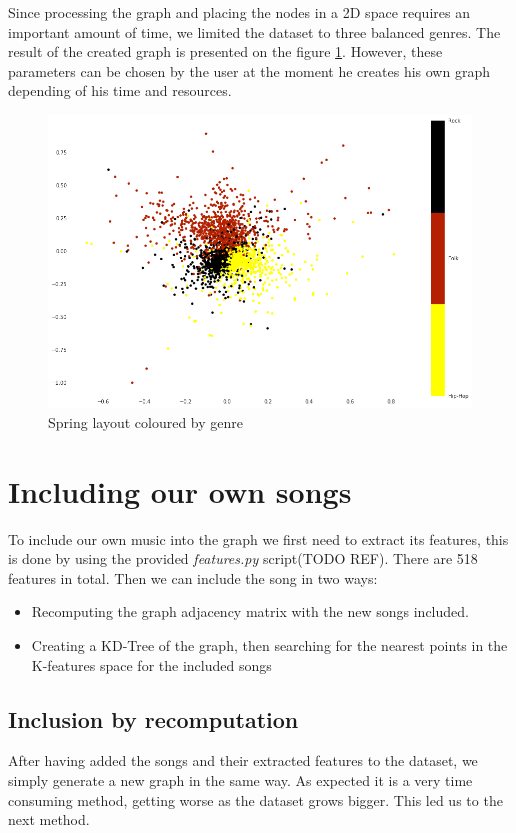 Since processing the graph and placing the nodes in a 2D space requires an important amount of time, we limited the dataset to three balanced genres. The result of the created graph is presented on the figure \ref{fig:spring_layout}. However, these parameters can be chosen by the user at the moment he creates his own graph depending of his time and resources.

\begin{figure}[H]
\centering
\includegraphics[width=\linewidth] {./Figures/graph_2}
\caption{Spring layout coloured by genre}
\label{fig:spring_layout}
\end{figure}
\section{Including our own songs}

To include our own music into the graph we first need to extract its features, this is done by using
the provided \textit{features.py} script(TODO REF). There are 518 features in total.
Then we can include the song in two ways:
\begin{itemize}
\item Recomputing the graph adjacency matrix with the new songs included.
\item Creating a KD-Tree of the graph, then searching for the nearest points in the K-features space for the included songs
\end{itemize}

\subsection{Inclusion by recomputation}
After having added the songs and their extracted features to the dataset, we simply generate a new graph in the same way. As expected it is a very time consuming method, getting worse as the dataset grows bigger. This led us to the next method. 

